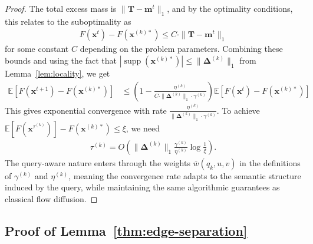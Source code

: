 \documentclass{article} %
\begin{document}
\begin{proof}
The total excess mass is $\|\mathbf{T} - \mathbf{m}^t\|_1$, and by the optimality conditions, this relates to the suboptimality as
\begin{align}
F(\mathbf{x}^t) - F(\mathbf{x}^{(k)*}) \leq C \cdot \|\mathbf{T} - \mathbf{m}^t\|_1
\end{align}
for some constant $C$ depending on the problem parameters.
Combining these bounds and using the fact that $|\operatorname{supp}(\mathbf{x}^{(k)*})| \leq \|\boldsymbol{\Delta}^{(k)}\|_1$ from Lemma~\ref{lem:locality}, we get
\begin{align}
\mathbb{E}[F(\mathbf{x}^{t+1}) - F(\mathbf{x}^{(k)*})] &\leq \left(1 - \frac{\eta^{(k)}}{C \cdot \|\boldsymbol{\Delta}^{(k)}\|_1 \cdot \gamma^{(k)}}\right) \mathbb{E}[F(\mathbf{x}^t) - F(\mathbf{x}^{(k)*})]
\end{align}
This gives exponential convergence with rate $\frac{\eta^{(k)}}{\|\boldsymbol{\Delta}^{(k)}\|_1 \cdot \gamma^{(k)}}$. To achieve $\mathbb{E}[F(\mathbf{x}^{\tau^{(k)}})] - F(\mathbf{x}^{(k)*}) \leq \xi$, we need
\begin{align}
\tau^{(k)} = O\left(\|\boldsymbol{\Delta}^{(k)}\|_1 \frac{\gamma^{(k)}}{\eta^{(k)}} \log \frac{1}{\xi}\right).
\end{align}
The query-aware nature enters through the weights $\bar{w}(q_k, u, v)$ in the definitions of $\gamma^{(k)}$ and $\eta^{(k)}$, meaning the convergence rate adapts to the semantic structure induced by the query, while maintaining the same algorithmic guarantees as classical flow diffusion.
\end{proof}


\subsection{Proof of Lemma~\ref{thm:edge-separation}}
\end{document}
